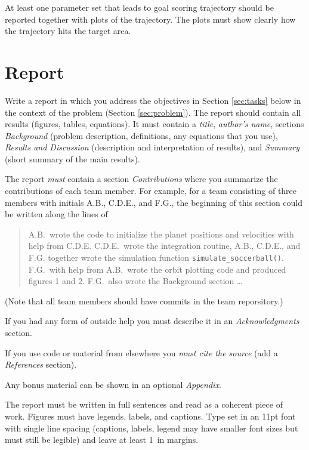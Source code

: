 \documentclass[letterpaper]{scrartcl}
\begin{document}
At least one parameter set that leads to goal scoring trajectory
should be reported together with plots of the trajectory. The plots
must show clearly how the trajectory hits the target area.

\section{Report}
\label{sec:report}

Write a report in which you address the objectives in Section
\ref{sec:tasks} below in the context of the problem (Section
\ref{sec:problem}). The report should contain all results (figures,
tables, equations). It must contain a \emph{title}, \emph{author's
  name}, sections \emph{Background} (problem description, definitions,
any equations that you use), \emph{Results and Discussion}
(description and interpretation of results), and \emph{Summary} (short
summary of the main results).

The report \emph{must} contain a section \emph{Contributions} where
you summarize the contributions of each team member. For example, for
a team consisting of three members with initials A.B., C.D.E., and
F.G., the beginning of this section could be written along the lines
of
\begin{quotation}
  A.B.\ wrote the code to initialize the planet positions and
  velocities with help from C.D.E. C.D.E.\ wrote the integration
  routine, A.B., C.D.E., and F.G. together wrote the simulation
  function \texttt{simulate\_soccerball()}. F.G.\ with help from A.B.\
  wrote the orbit plotting code and produced figures 1 and 2. F.G.\
  also wrote the Background section \dots
\end{quotation}
(Note that all team members should have commits in the team
reporsitory.)

If you had any form of outside help you must describe it in an
\emph{Acknowledgments} section. 

If you use code or material from elsewhere you \emph{must cite the
  source} (add a \emph{References} section). 

Any bonus material can be shown in an optional \emph{Appendix}.

The report must be written in full sentences and read as a coherent
piece of work. Figures must have legends, labels, and captions. Type
set in an 11pt font with single line spacing (captions, labels, legend
may have smaller font sizes but must still be legible) and leave at
least 1~in margins. 
\end{document}
